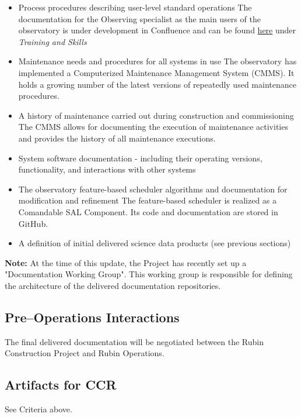 \begin{itemize}
	\item Process procedures describing user-level standard operations
	The documentation for the Observing specialist as the main users of the observatory is under development in Confluence and can be found \href{https://rubinobs.atlassian.net/wiki/spaces/OST/overview}{here} under \it{Training and Skills}
	
	\item Maintenance needs and procedures for all systems in use
	The observatory has implemented a Computerized Maintenance Management System (CMMS). 
	It holds a growing number of the latest versions of repeatedly used maintenance procedures.
	
	\item A history of maintenance carried out during construction and commissioning
	The CMMS allows for documenting the execution of maintenance activities and provides the history of all maintenance executions.

	\item System software documentation - including their operating versions, functionality, and interactions with other systems
	
	\item The observatory feature-based scheduler algorithms and documentation for modification and refinement
	The feature-based scheduler is realized as a Comandable SAL Component. Its code and documentation are stored in GitHub.
	
	\item A definition of initial delivered science data products (see previous sections)	
\end{itemize}

{\bf Note:} At the time of this update, the Project has recently set up a "Documentation Working Group".  This working group is responsible for defining the architecture of the delivered documentation repositories.

\subsection{Pre--Operations Interactions}

The final delivered documentation will be negotiated between the Rubin Construction Project and Rubin Operations.

\subsection{Artifacts for CCR}

See Criteria above.
